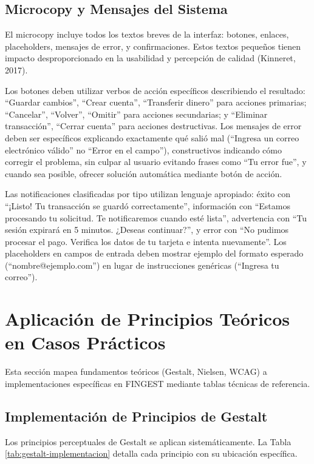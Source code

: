 \documentclass[12pt,a4paper,oneside]{article}
\begin{document}
\subsection{Microcopy y Mensajes del Sistema}

El microcopy incluye todos los textos breves de la interfaz: botones, enlaces, placeholders, mensajes de error, y confirmaciones. Estos textos pequeños tienen impacto desproporcionado en la usabilidad y percepción de calidad (Kinneret, 2017).

Los botones deben utilizar verbos de acción específicos describiendo el resultado: ``Guardar cambios'', ``Crear cuenta'', ``Transferir dinero'' para acciones primarias; ``Cancelar'', ``Volver'', ``Omitir'' para acciones secundarias; y ``Eliminar transacción'', ``Cerrar cuenta'' para acciones destructivas. Los mensajes de error deben ser específicos explicando exactamente qué salió mal (``Ingresa un correo electrónico válido'' no ``Error en el campo''), constructivos indicando cómo corregir el problema, sin culpar al usuario evitando frases como ``Tu error fue'', y cuando sea posible, ofrecer solución automática mediante botón de acción.

Las notificaciones clasificadas por tipo utilizan lenguaje apropiado: éxito con ``¡Listo! Tu transacción se guardó correctamente'', información con ``Estamos procesando tu solicitud. Te notificaremos cuando esté lista'', advertencia con ``Tu sesión expirará en 5 minutos. ¿Deseas continuar?'', y error con ``No pudimos procesar el pago. Verifica los datos de tu tarjeta e intenta nuevamente''. Los placeholders en campos de entrada deben mostrar ejemplo del formato esperado (``nombre@ejemplo.com'') en lugar de instrucciones genéricas (``Ingresa tu correo'').

\section{Aplicación de Principios Teóricos en Casos Prácticos}

Esta sección mapea fundamentos teóricos (Gestalt, Nielsen, WCAG) a implementaciones específicas en FINGEST mediante tablas técnicas de referencia.

\subsection{Implementación de Principios de Gestalt}

Los principios perceptuales de Gestalt se aplican sistemáticamente. La Tabla \ref{tab:gestalt-implementacion} detalla cada principio con su ubicación específica.
\end{document}
